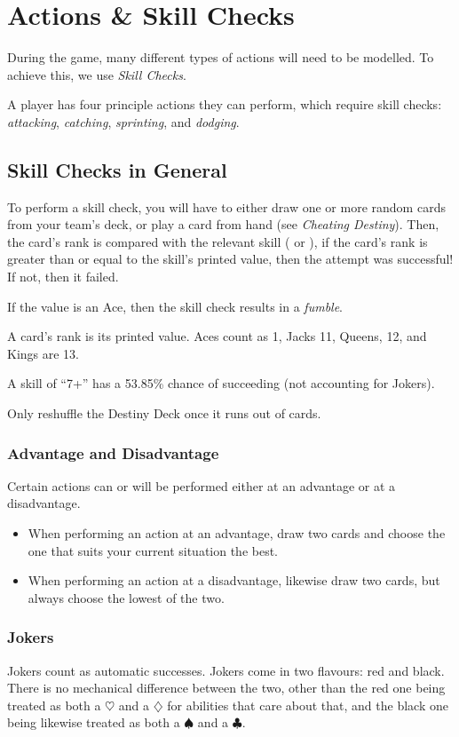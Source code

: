 \section{Actions \& Skill Checks}\label{skill-checks}
During the game, many different types of actions will need to be modelled.
To achieve this, we use \textit{Skill Checks}.

A player has four principle actions they can perform, which require skill checks: \textit{attacking}, \textit{catching}, \textit{sprinting}, and \textit{dodging}.

\subsection{Skill Checks in General}
To perform a skill check, you will have to either draw one or more random cards from your team's \destiny{} deck, or play a card from hand (see \textit{Cheating Destiny}).
Then, the card's rank is compared with the relevant skill (\str{} or \agi{}), if the card's rank is greater than or equal to the skill's printed value, then the attempt was successful!
If not, then it failed.

If the value is an Ace, then the skill check results in a \textit{fumble}.

\begin{note}
    A card's rank is its printed value. Aces count as 1, Jacks 11, Queens, 12, and Kings are 13.

    A skill of ``7+'' has a 53.85\% chance of succeeding (not accounting for Jokers).
\end{note}

Only reshuffle the Destiny Deck once it runs out of cards.

\subsubsection{Advantage and Disadvantage}
Certain actions can or will be performed either at an advantage or at a disadvantage.

\begin{itemize}
    \item When performing an action at an advantage, draw two cards and choose the one that suits your current situation the best.
    \item When performing an action at a disadvantage, likewise draw two cards, but always choose the lowest of the two.
\end{itemize}

\subsubsection{Jokers}
Jokers count as automatic successes.
Jokers come in two flavours: red and black.
There is no mechanical difference between the two, other than the red one being treated as both a $\heartsuit$ and a $\diamondsuit$ for abilities that care about that, and the black one being likewise treated as both a $\spadesuit$ and a $\clubsuit$.

